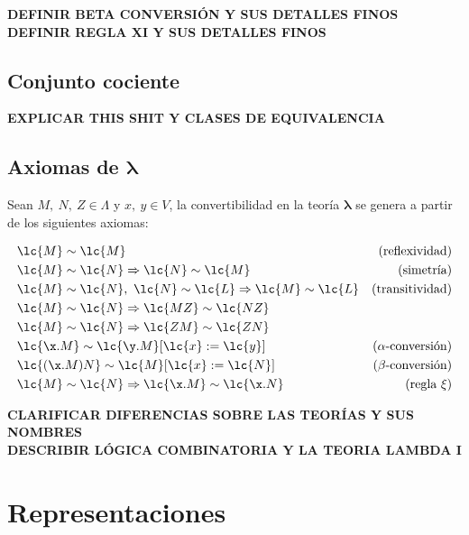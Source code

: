 \textbf{DEFINIR BETA CONVERSIÓN Y SUS DETALLES FINOS}\\

\textbf{DEFINIR REGLA XI Y SUS DETALLES FINOS}\\

\subsection{Conjunto cociente}\label{sec:1.2.3}

\textbf{EXPLICAR THIS SHIT Y CLASES DE EQUIVALENCIA}\\

\subsection{Axiomas de \texorpdfstring{$\boldsymbol\lambda$}{lambda}} \label{sec:1.2.4}

Sean \(M,\ N,\ Z\in \Lambda\) y \(x,\ y\in V\), la convertibilidad en la teoría
\(\boldsymbol\lambda\) se genera a partir de los siguientes axiomas:

\begin{align}
  &\lc{M} \sim \lc{M} &(\text{reflexividad})\\
  &\lc{M} \sim \lc{N} \Rightarrow \lc{N} \sim \lc{M} &(\text{simetría})\\
  &\lc{M} \sim \lc{N},\ \lc{N} \sim \lc{L} \Rightarrow \lc{M} \sim \lc{L} &(\text{transitividad})\\
  &\lc{M} \sim \lc{N} \Rightarrow \lc{M Z} \sim \lc{N Z}\\
  &\lc{M} \sim \lc{N} \Rightarrow \lc{Z M} \sim \lc{Z N}\\
  &\lc{\x.M} \sim \lc{\y.M}[\lc{x}:=\lc{y}] &(\alpha\text{-conversión})\\
  &\lc{(\x.M)N} \sim \lc{M}[\lc{x}:=\lc{N}] &(\beta\text{-conversión})\\
  &\lc{M} \sim \lc{N} \Rightarrow \lc{\x.M} \sim \lc{\x.N} &(\text{regla } \xi)
\end{align}

\textbf{CLARIFICAR DIFERENCIAS SOBRE LAS TEORÍAS Y SUS NOMBRES}\\

\textbf{DESCRIBIR LÓGICA COMBINATORIA Y LA TEORIA LAMBDA I}

\section{Representaciones} \label{sec:1.3}

